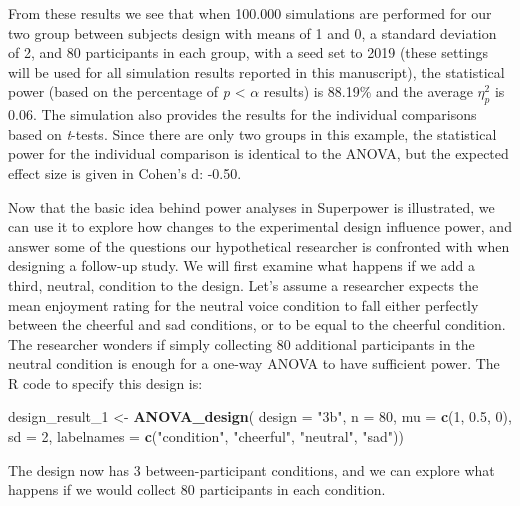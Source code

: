 \documentclass[
  ,jou,floatsintext]{apa6}
\newenvironment{Shaded}{\begin{snugshade}}{\end{snugshade}}
\newcommand{\DataTypeTok}[1]{\textcolor[rgb]{0.13,0.29,0.53}{#1}}
\newcommand{\DecValTok}[1]{\textcolor[rgb]{0.00,0.00,0.81}{#1}}
\newcommand{\FloatTok}[1]{\textcolor[rgb]{0.00,0.00,0.81}{#1}}
\newcommand{\KeywordTok}[1]{\textcolor[rgb]{0.13,0.29,0.53}{\textbf{#1}}}
\newcommand{\NormalTok}[1]{#1}
\newcommand{\StringTok}[1]{\textcolor[rgb]{0.31,0.60,0.02}{#1}}
\begin{document}
From these results we see that when 100.000 simulations are performed for our two group between subjects design with means of 1 and 0, a standard deviation of 2, and 80 participants in each group, with a seed set to 2019 (these settings will be used for all simulation results reported in this manuscript), the statistical power (based on the percentage of \emph{p} \textless{} \(\alpha\) results) is 88.19\% and the average \(\eta_p^2\) is 0.06.
The simulation also provides the results for the individual comparisons based on \emph{t}-tests.
Since there are only two groups in this example, the statistical power for the individual comparison is identical to the ANOVA, but the expected effect size is given in Cohen's d: -0.50.

Now that the basic idea behind power analyses in Superpower is illustrated, we can use it to explore how changes to the experimental design influence power, and answer some of the questions our hypothetical researcher is confronted with when designing a follow-up study.
We will first examine what happens if we add a third, neutral, condition to the design.
Let's assume a researcher expects the mean enjoyment rating for the neutral voice condition to fall either perfectly between the cheerful and sad conditions, or to be equal to the cheerful condition.
The researcher wonders if simply collecting 80 additional participants in the neutral condition is enough for a one-way ANOVA to have sufficient power.
The R code to specify this design is:

\begin{Shaded}
\begin{Highlighting}[]
\NormalTok{design_result_}\DecValTok{1}\NormalTok{ <-}\StringTok{ }\KeywordTok{ANOVA_design}\NormalTok{(}
  \DataTypeTok{design =} \StringTok{"3b"}\NormalTok{, }\DataTypeTok{n =} \DecValTok{80}\NormalTok{, }
  \DataTypeTok{mu =} \KeywordTok{c}\NormalTok{(}\DecValTok{1}\NormalTok{, }\FloatTok{0.5}\NormalTok{, }\DecValTok{0}\NormalTok{), }\DataTypeTok{sd =} \DecValTok{2}\NormalTok{, }
  \DataTypeTok{labelnames =} \KeywordTok{c}\NormalTok{(}\StringTok{"condition"}\NormalTok{, }
                 \StringTok{"cheerful"}\NormalTok{, }\StringTok{"neutral"}\NormalTok{, }\StringTok{"sad"}\NormalTok{))}
\end{Highlighting}
\end{Shaded}

The design now has 3 between-participant conditions, and we can explore what happens if we would collect 80 participants in each condition.
\end{document}
